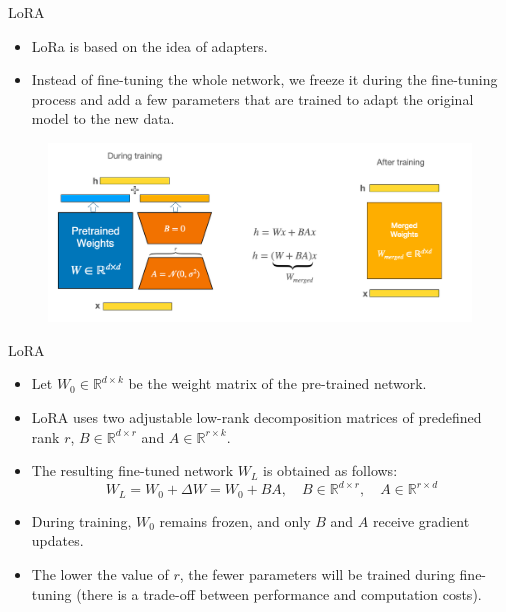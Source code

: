 \documentclass[handout]{beamer}
\begin{document}
\begin{frame}{LoRA}
\begin{scriptsize}
\begin{itemize}
    \item LoRa is based on the idea of adapters.
\item Instead of fine-tuning the whole network, we freeze it during the fine-tuning process and add a few parameters that are trained to adapt the original model to the new data.
          \end{itemize}

      \begin{figure}[h]
	\includegraphics[scale = 0.25]{pics/lora.png}
\end{figure}

\end{scriptsize}
\end{frame}


\begin{frame}{LoRA}
\begin{scriptsize}
\begin{itemize}
        \item Let $W_0 \in \mathbb{R}^{d \times k}$ be the weight matrix of the pre-trained network.
    \item LoRA uses two adjustable low-rank decomposition matrices of predefined rank $r$, \(B \in \mathbb{R}^{d \times r}\) and \(A \in \mathbb{R}^{r \times k}\).
    \item The resulting fine-tuned network $W_L$ is obtained as follows:
      \begin{equation}
    W_L = W_0 + \Delta W = W_0 + BA, \quad B \in \mathbb{R}^{d \times r}, \quad A \in \mathbb{R}^{r \times d}
  \end{equation}
 \item During training, \(W_0\) remains frozen, and only \(B\) and \(A\) receive gradient updates.
 \item The lower the value of $r$, the fewer parameters will be trained during fine-tuning (there is a trade-off between performance and computation costs).
      \end{itemize}

\end{scriptsize}
\end{frame}
\end{document}
